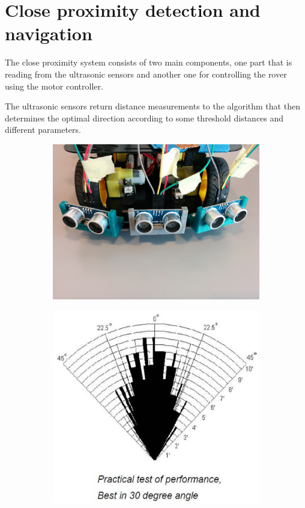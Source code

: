 \clearpage
\section{Close proximity detection and navigation}
The close proximity system consists of two main components, one part that is reading from the ultrasonic sensors and another one for controlling the rover using the motor controller.

The ultrasonic sensors return distance measurements to the algorithm that then determines the optimal direction according to some threshold distances and different parameters.

\begin{figure}[H]
	\centering
	\begin{subfigure}[H]{0.4\textwidth}
		\includegraphics[width=\textwidth]{images/mounted_ultrasonic_sensors.jpg}
		\label{mounted_ultrasonicsensors}
	\end{subfigure}%
	\quad
	\begin{subfigure}[H]{0.4\textwidth}
		\includegraphics[width=\textwidth]{images/hcsr04angle.png}

\end{subfigure}
\end{figure}
